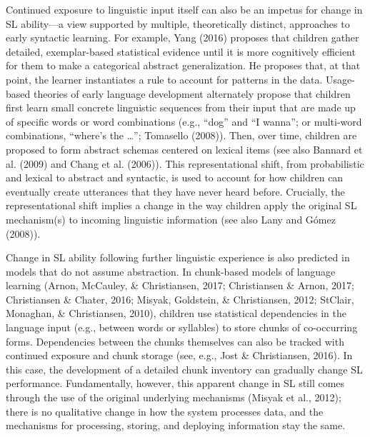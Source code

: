 \documentclass[
  english,
  man,mask,floatsintext]{apa6}
\begin{document}
Continued exposure to linguistic input itself can also be an impetus for change in SL ability---a view supported by multiple, theoretically distinct, approaches to early syntactic learning. For example, Yang (2016) proposes that children gather detailed, exemplar-based statistical evidence until it is more cognitively efficient for them to make a categorical abstract generalization. He proposes that, at that point, the learner instantiates a rule to account for patterns in the data. Usage-based theories of early language development alternately propose that children first learn small concrete linguistic sequences from their input that are made up of specific words or word combinations (e.g., \enquote{dog} and \enquote{I wanna}; or multi-word combinations, \enquote{where's the \ldots{}}; Tomasello (2008)). Then, over time, children are proposed to form abstract schemas centered on lexical items (see also Bannard et al. (2009) and Chang et al. (2006)). This representational shift, from probabilistic and lexical to abstract and syntactic, is used to account for how children can eventually create utterances that they have never heard before. Crucially, the representational shift implies a change in the way children apply the original SL mechanism(s) to incoming linguistic information (see also Lany and Gómez (2008)).

Change in SL ability following further linguistic experience is also predicted in models that do not assume abstraction. In chunk-based models of language learning (Arnon, McCauley, \& Christiansen, 2017; Christiansen \& Arnon, 2017; Christiansen \& Chater, 2016; Misyak, Goldstein, \& Christiansen, 2012; StClair, Monaghan, \& Christiansen, 2010), children use statistical dependencies in the language input (e.g., between words or syllables) to store chunks of co-occurring forms. Dependencies between the chunks themselves can also be tracked with continued exposure and chunk storage (see, e.g., Jost \& Christiansen, 2016). In this case, the development of a detailed chunk inventory can gradually change SL performance. Fundamentally, however, this apparent change in SL still comes through the use of the original underlying mechanisms (Misyak et al., 2012); there is no qualitative change in how the system processes data, and the mechanisms for processing, storing, and deploying information stay the same.
\end{document}
